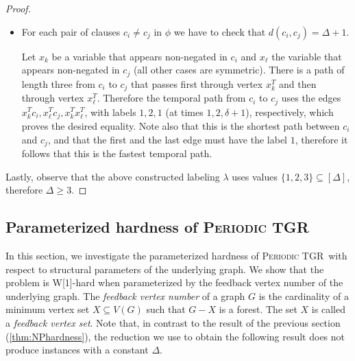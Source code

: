 \documentclass[a4paper,UKenglish,cleveref, autoref, thm-restate]{lipics-v2021}
\newcommand{\deltaExact}{\textsc{Periodic TGR}}
\begin{document}
\begin{proof}
\begin{itemize}
    \item For each pair of clauses $c_i \neq c_j$ in $\phi$ we have to check that
    $d(c_i,c_j)= \Delta + 1$.

    Let $x_k$ be a variable that appears non-negated in $c_i$
    and $x_\ell$ the variable that appears non-negated in $c_j$
    (all other cases are symmetric).
    There is a path of length three from $c_i$ to $c_j$
    that passes first through vertex $x_k^T$ and then through vertex $x_\ell^T$.
    Therefore the temporal path from $c_i$ to $c_j$
    uses the edges $x_k^T c_i, x_\ell ^T c_j, x_k^T x_\ell ^T$, with labels $1,2,1$ (at times $1, 2, \delta + 1$), respectively,
    which proves the desired equality.
    Note also that this is the shortest path between $c_i$ and $c_j$, and that the first and the last edge must have the label $1$,
    therefore it follows that this is the fastest temporal path.
\end{itemize}
Lastly, observe that the above constructed labeling $\lambda$ uses values $\{1,2,3\}\subseteq[\Delta]$, therefore $\Delta\ge 3$.
\end{proof}


\subsection{Parameterized hardness of \deltaExact}\label{sec:w1hardness}

In this section, we investigate the parameterized hardness of \deltaExact\ with respect to structural parameters of the underlying graph. We show that the problem is W[1]-hard when parameterized by the feedback vertex number of the underlying graph. The \emph{feedback vertex number} of a graph $G$ is the cardinality of a minimum vertex set $X\subseteq V(G)$ such that $G-X$ is a forest. The set $X$ is called a \emph{feedback vertex set}. 
Note that, in contrast to the result of the previous section (\cref{thm:NPhardness}), the reduction we use to obtain the following result does not produce instances with a constant $\Delta$.
\end{document}
